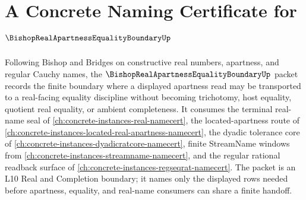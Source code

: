 \chapter{A Concrete Naming Certificate for $\BishopRealApartnessEqualityBoundaryUp$}
\label{ch:concrete-instances-bishop-real-apartness-equality-boundary-namecert}

Following Bishop and Bridges on constructive real numbers, apartness, and regular Cauchy names, the $\BishopRealApartnessEqualityBoundaryUp$ packet records the finite boundary where a displayed apartness read may be transported to a real-facing equality discipline without becoming trichotomy, host equality, quotient real equality, or ambient completeness. It consumes the terminal real-name seal of \autoref{ch:concrete-instances-real-namecert}, the located-apartness route of \autoref{ch:concrete-instances-located-real-apartness-namecert}, the dyadic tolerance core of \autoref{ch:concrete-instances-dyadicratcore-namecert}, finite StreamName windows from \autoref{ch:concrete-instances-streamname-namecert}, and the regular rational readback surface of \autoref{ch:concrete-instances-regseqrat-namecert}. The packet is an L10 Real and Completion boundary; it names only the displayed rows needed before apartness, equality, and real-name consumers can share a finite handoff.

